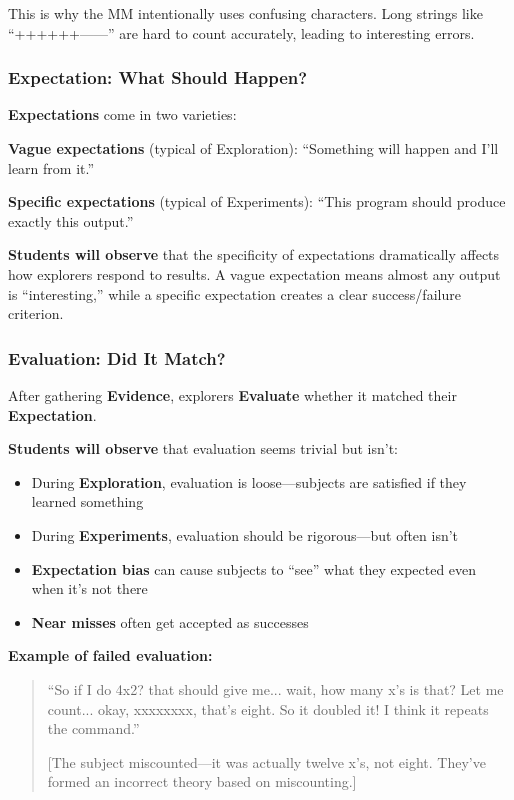 \documentclass[12pt,letterpaper]{article}
\begin{document}
This is why the MM intentionally uses confusing characters. Long strings like ``++++++------'' are hard to count accurately, leading to interesting errors.

\subsubsection{Expectation: What Should Happen?}

\textbf{Expectations} come in two varieties:

\textbf{Vague expectations} (typical of Exploration): ``Something will happen and I'll learn from it.''

\textbf{Specific expectations} (typical of Experiments): ``This program should produce exactly this output.''

\textbf{Students will observe} that the specificity of expectations dramatically affects how explorers respond to results. A vague expectation means almost any output is ``interesting,'' while a specific expectation creates a clear success/failure criterion.

\subsubsection{Evaluation: Did It Match?}

After gathering \textbf{Evidence}, explorers \textbf{Evaluate} whether it matched their \textbf{Expectation}. 

\textbf{Students will observe} that evaluation seems trivial but isn't:

\begin{itemize}
\item During \textbf{Exploration}, evaluation is loose—subjects are satisfied if they learned something
\item During \textbf{Experiments}, evaluation should be rigorous—but often isn't
\item \textbf{Expectation bias} can cause subjects to ``see'' what they expected even when it's not there
\item \textbf{Near misses} often get accepted as successes
\end{itemize}

\textbf{Example of failed evaluation:}
\begin{quote}
``So if I do 4x2? that should give me... wait, how many x's is that? Let me count... okay, xxxxxxxx, that's eight. So it doubled it! I think it repeats the command.''

[The subject miscounted—it was actually twelve x's, not eight. They've formed an incorrect theory based on miscounting.]
\end{quote}
\end{document}
